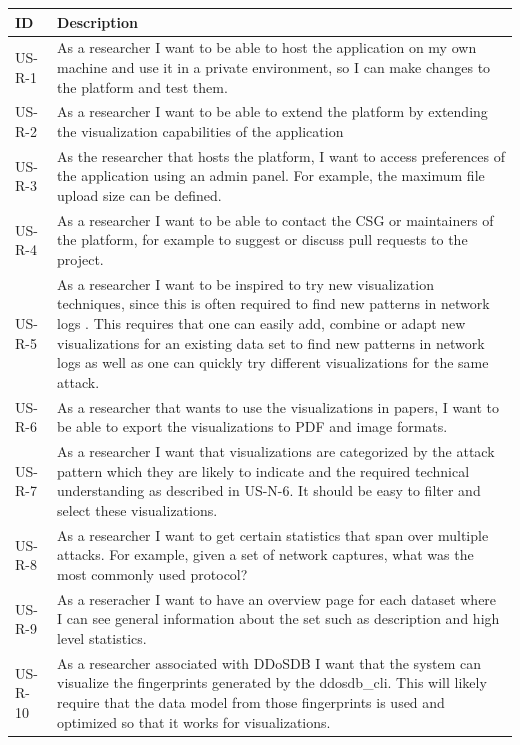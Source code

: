 \begin{table}[]
\centering
\begin{tabular}{|p{1.6cm}|p{12cm}|}
\hline
\textbf{ID} & \textbf{Description} \\ \hline

US-R-1        & As a researcher I want to be able to host the application on my own machine and use it in a private environment, so I can make changes to the platform and test them.\\ \hline
US-R-2         & As a researcher I want to be able to extend the platform by extending the visualization capabilities of the application\\ \hline
US-R-3        & As the researcher that hosts the platform, I want to access preferences of the application using an admin panel. For example, the maximum file upload size can be defined.\\ \hline
US-R-4        & As a researcher I want to be able to contact the CSG or maintainers of the platform, for example to suggest or discuss pull requests to the project.\\ \hline
US-R-5       & As a researcher I want to be inspired to try new visualization techniques, since this is often required to find new patterns in network logs \cite{appliedsecurityvisualization}. This requires that one can easily add, combine or adapt new visualizations for an existing data set to find new patterns in network logs as well as one can quickly try different visualizations for the same attack.\\ \hline
US-R-6       & As a researcher that  wants to use the visualizations in papers, I want to be able to export the visualizations to PDF and image formats.\\ \hline
US-R-7       & As a researcher I want that visualizations are categorized by the attack pattern which they are likely to indicate and the required technical understanding as described in US-N-6. It should be easy to filter and select these visualizations.\\ \hline
US-R-8      & As a researcher I want to get certain statistics that span over multiple attacks. For example, given a set of network captures, what was the most commonly used protocol?\\ \hline
US-R-9      & As a reseracher I want to have an overview page for each dataset where I can see general information about the set such as description and high level statistics.\\ \hline
US-R-10     & As a researcher associated with DDoSDB I want that the system can visualize the fingerprints generated by the ddosdb\_cli. This will likely require that the data model from those fingerprints is used and optimized so that it works for visualizations. \\ \hline

\end{tabular}
\end{table}

